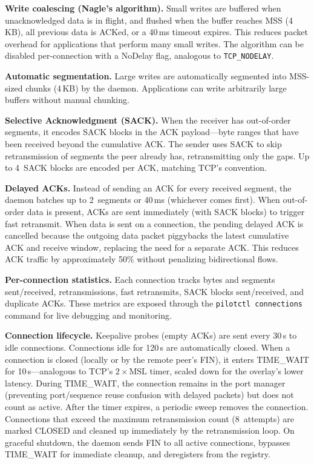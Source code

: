 \documentclass[11pt,a4paper]{article}
\begin{document}
\textbf{Write coalescing (Nagle's algorithm).} Small writes are buffered when unacknowledged data is in flight, and flushed when the buffer reaches MSS (4\,KB), all previous data is ACKed, or a 40\,ms timeout expires. This reduces packet overhead for applications that perform many small writes. The algorithm can be disabled per-connection with a NoDelay flag, analogous to \texttt{TCP\_NODELAY}.

\textbf{Automatic segmentation.} Large writes are automatically segmented into MSS-sized chunks (4\,KB) by the daemon. Applications can write arbitrarily large buffers without manual chunking.

\textbf{Selective Acknowledgment (SACK).} When the receiver has out-of-order segments, it encodes SACK blocks in the ACK payload---byte ranges that have been received beyond the cumulative ACK. The sender uses SACK to skip retransmission of segments the peer already has, retransmitting only the gaps. Up to 4~SACK blocks are encoded per ACK, matching TCP's convention.

\textbf{Delayed ACKs.} Instead of sending an ACK for every received segment, the daemon batches up to 2~segments or 40\,ms (whichever comes first). When out-of-order data is present, ACKs are sent immediately (with SACK blocks) to trigger fast retransmit. When data is sent on a connection, the pending delayed ACK is cancelled because the outgoing data packet piggybacks the latest cumulative ACK and receive window, replacing the need for a separate ACK. This reduces ACK traffic by approximately 50\% without penalizing bidirectional flows.

\textbf{Per-connection statistics.} Each connection tracks bytes and segments sent/received, retransmissions, fast retransmits, SACK blocks sent/received, and duplicate ACKs. These metrics are exposed through the \texttt{pilotctl connections} command for live debugging and monitoring.

\textbf{Connection lifecycle.} Keepalive probes (empty ACKs) are sent every 30\,s to idle connections. Connections idle for 120\,s are automatically closed. When a connection is closed (locally or by the remote peer's FIN), it enters TIME\_WAIT for 10\,s---analogous to TCP's $2 \times \text{MSL}$ timer, scaled down for the overlay's lower latency. During TIME\_WAIT, the connection remains in the port manager (preventing port/sequence reuse confusion with delayed packets) but does not count as active. After the timer expires, a periodic sweep removes the connection. Connections that exceed the maximum retransmission count (8~attempts) are marked CLOSED and cleaned up immediately by the retransmission loop. On graceful shutdown, the daemon sends FIN to all active connections, bypasses TIME\_WAIT for immediate cleanup, and deregisters from the registry.
\end{document}
